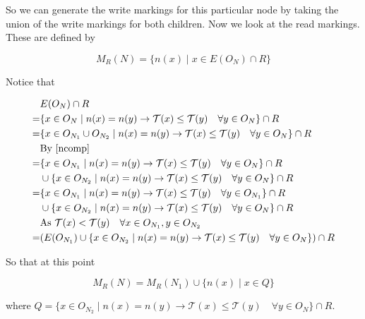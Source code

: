 \documentclass{report}
\begin{document}
So we can generate the write markings for this particular node by taking the union of the write markings for both children. Now we look at the read
markings. These are defined by

$$M_R(N) = \{n(x) \mid x \in E(O_N) \cap R \}$$

Notice that

\begin{align*}
& E(O_N) \cap R \\
=& \{x \in O_N \mid n(x) = n(y) \rightarrow \mathcal{T}(x) \le \mathcal{T}(y) \quad \forall y \in O_N \} \cap R \\
=& \{x \in O_{N_1} \cup O_{N_2} \mid n(x) = n(y) \rightarrow \mathcal{T}(x) \le \mathcal{T}(y) \quad \forall y \in O_N \} \cap R\\
& \text{By \eqref{ncomp}} \\
=& \{x \in O_{N_1} \mid n(x) = n(y) \rightarrow \mathcal{T}(x) \le \mathcal{T}(y) \quad \forall y \in O_N \} \cap R \\
& \cup \{x \in O_{N_2} \mid n(x) = n(y) \rightarrow \mathcal{T}(x) \le \mathcal{T}(y) \quad \forall y \in O_N \} \cap R \\
=& \{x \in O_{N_1} \mid n(x) = n(y) \rightarrow \mathcal{T}(x) \le \mathcal{T}(y) \quad \forall y \in O_{N_1} \} \cap R \\
& \cup \{x \in O_{N_2} \mid n(x) = n(y) \rightarrow \mathcal{T}(x) \le \mathcal{T}(y) \quad \forall y \in O_N \} \cap R \\
& \text{As $\mathcal{T}(x) < \mathcal{T}(y) \quad \forall x \in O_{N_1}, y \in O_{N_2}$} \\
=& (E(O_{N_1}) \cup \{x \in O_{N_2} \mid n(x) = n(y) \rightarrow \mathcal{T}(x) \le \mathcal{T}(y) \quad \forall y \in O_N \}) \cap R
\end{align*}

So that at this point 

$$M_R(N) = M_R(N_1) \cup \{n(x) \mid x \in Q \}$$

where $Q = \{x \in O_{N_2} \mid n(x) = n(y) \rightarrow \mathcal{T}(x) \le \mathcal{T}(y) \quad \forall y \in O_N \} \cap R$.
\end{document}
